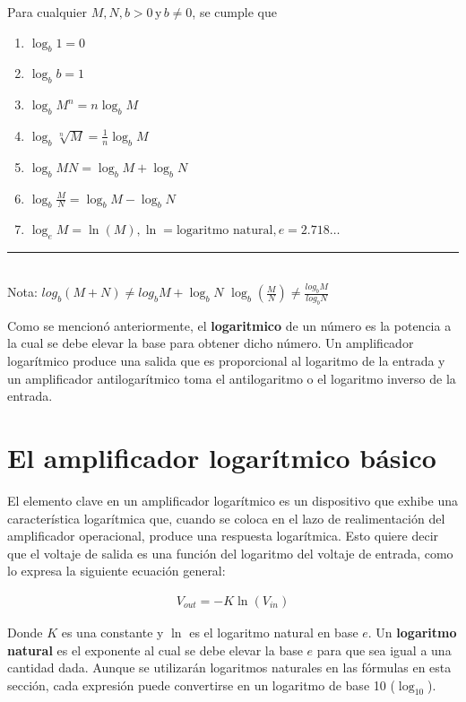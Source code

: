\documentclass{article}
\begin{document}
	\begin{tcolorbox}[colback=red!5!white,colframe=red!75!black,arc=0mm,boxrule=0mm,width=(\linewidth+0.5cm),title=Propiedades de los logaritmos,colbacktitle=red!60!white,coltitle=white]
		Para cualquier $M, N, b > 0  \mathrm{ \, y \, } b \neq 0$, se cumple que
		\begin{enumerate}[] 
			\item $\log_b 1 = 0$
			\item $\log_b b = 1$
			\item $\log_b M^n = n \log_b M$
			\item $\log_b \sqrt[n]{M} = \frac{1}{n} \log_b M$
			\item $\log_b MN = \log_b M + \log_b N$
			\item $\log_b \frac{M}{N} = \log_b M - \log_b N$
			\item $\log_e M = \ln(M), \ln = \mathrm{logaritmo \,\, natural}, e =2.718 \dots$ 
		\end{enumerate}
		\rule{6cm}{0.4pt} \\
		Nota: $log_b (M +N) \neq log_b M + \log_b N$ \qquad \qquad $\log_b \left( \frac{M}{N} \right) \neq \frac{log_b M}{log_b N}$
	\end{tcolorbox}
	
	\noindent Como se mencionó anteriormente, el \textbf{logaritmico} de un número es la potencia a la cual se debe elevar la base para obtener dicho número. Un amplificador logarítmico produce una salida que es proporcional al logaritmo de la entrada y un amplificador antilogarítmico toma el antilogaritmo o el logaritmo inverso de la entrada.
	
	\section*{El amplificador logarítmico básico}
	El elemento clave en un amplificador logarítmico es un dispositivo que exhibe una característica logarítmica que, cuando se coloca en el lazo de realimentación del amplificador operacional, produce una respuesta logarítmica. Esto quiere decir que el voltaje de salida es una función del logaritmo del voltaje de entrada, como lo expresa la siguiente ecuación general:
	
	\begin{align}
		V_{out} = -K \ln (V_{in})
	\end{align}
	
	\noindent Donde $K$ es una constante y $\ln$ es el logaritmo natural en base $e$. Un \textbf{logaritmo natural} es el exponente al cual se debe elevar la base $e$ para que sea igual a una cantidad dada. Aunque se utilizarán logaritmos naturales en las fórmulas en esta sección, cada expresión puede convertirse en un logaritmo de base 10 ($\log_{10}$).
	
\end{document}
